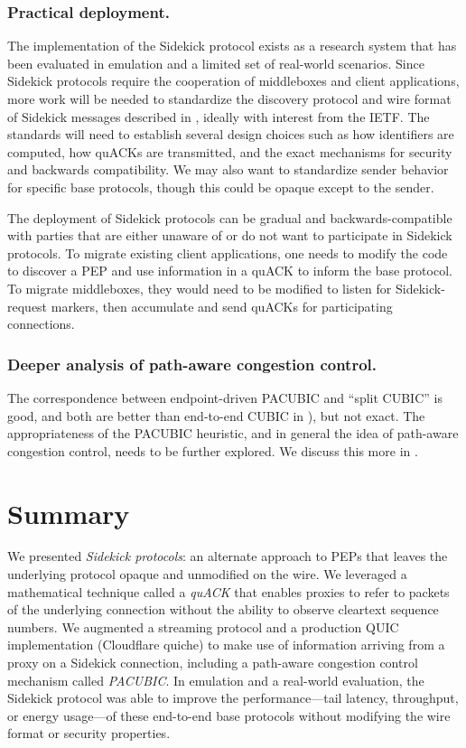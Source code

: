 \subsubsection{Practical deployment.}

The implementation of the Sidekick protocol exists as a research system that has
been evaluated in emulation and a limited set of real-world scenarios. Since
Sidekick protocols require the cooperation of middleboxes and client
applications, more work will be needed to standardize the discovery protocol
and wire format of Sidekick messages described in ,
ideally with interest from the IETF. The standards will need to establish
several design choices such as how identifiers are computed, how quACKs are
transmitted, and the exact mechanisms for security and backwards compatibility.
We may also want to standardize sender behavior for specific base protocols,
though this could be opaque except to the sender.

The deployment of Sidekick protocols can be gradual and backwards-compatible
with parties that are either unaware of or do not want to participate in Sidekick
protocols.
To migrate existing client applications, one needs to modify the code to
discover a PEP and use information in a quACK to inform the base protocol.
To migrate middleboxes, they would need to be modified to listen for
Sidekick-request markers, then accumulate and send quACKs for participating
connections.

\subsubsection{Deeper analysis of path-aware congestion control.}

The correspondence between endpoint-driven PACUBIC and ``split CUBIC'' is good,
and both are better than end-to-end CUBIC in ), but not
exact. The appropriateness of the PACUBIC heuristic, and in general the idea of
path-aware congestion control, needs to be further explored. We discuss this
more in .

\section{Summary}
\label{sec:sidekick:summary}

We presented \textit{Sidekick protocols}: an alternate approach to PEPs that
leaves the underlying protocol opaque and unmodified on the wire. We leveraged
a mathematical technique called a \textit{quACK} that enables proxies to refer
to packets of the underlying connection without the ability to observe
cleartext sequence numbers. We augmented a streaming protocol and a production
QUIC implementation (Cloudflare quiche) to make use of information arriving
from a proxy on a Sidekick connection, including a path-aware congestion control
mechanism called \textit{PACUBIC}. In emulation and a real-world evaluation,
the Sidekick protocol was able to improve the performance---tail latency,
throughput, or energy usage---of these end-to-end base protocols without
modifying the wire format or security properties.
